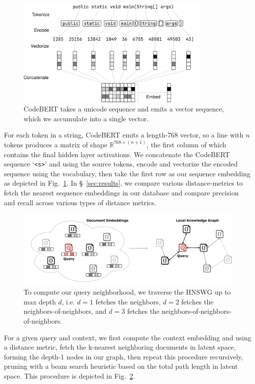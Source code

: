 \documentclass[11pt]{article}
\begin{document}
\begin{figure}[H]
  \centering
  \includegraphics[width=0.85\textwidth]{bert_embedding}
  \caption{CodeBERT takes a unicode sequence and emits a vector sequence, which we accumulate into a single vector.}
  \label{fig:bert}
\end{figure}

For each token in a string, CodeBERT emits a length-768 vector, so a line with $n$ tokens produces a matrix of shape $\mathbb R^{768 \times (n + 1)}$, the first column of which contains the final hidden layer activations. We concatenate the CodeBERT sequence `\texttt{<s>}' and using the source tokens, encode and vectorize the encoded sequence using the vocabulary, then take the first row as our sequence embedding as depicted in Fig.~\ref{fig:bert}. In \S~\ref{sec:results}, we compare various distance-metrics to fetch the nearest sequence embeddings in our database and compare precision and recall across various types of distance metrics.

\begin{figure}[H]
  \centering
  \includegraphics[width=\textwidth]{latent_kg}
  \caption{To compute our query neighborhood, we traverse the HNSWG up to max depth $d$, i.e. $d=1$ fetches the neighbors, $d=2$ fetches the neighbors-of-neighbors, and $d=3$ fetches the neighbors-of-neighbors-of-neighbors.}
  \label{fig:de2kg}
\end{figure}

For a given query and context, we first compute the context embedding and using a distance metric, fetch the k-nearest neighboring documents in latent space, forming the depth-1 nodes in our graph, then repeat this procedure recursively, pruning with a beam search heuristic based on the total path length in latent space. This procedure is depicted in Fig.~\ref{fig:de2kg}.
\end{document}
